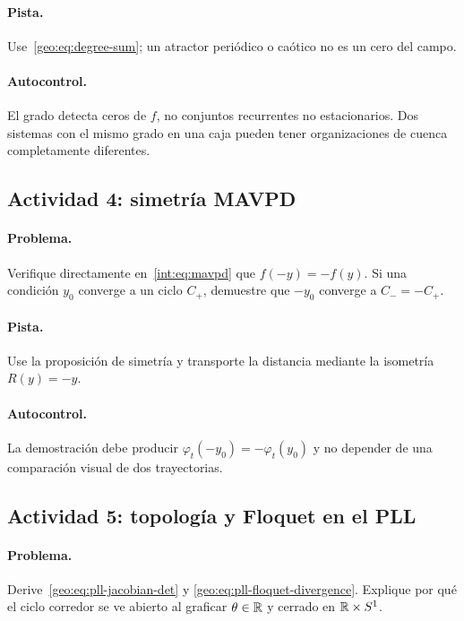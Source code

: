 \paragraph{Pista.}
Use~\eqref{geo:eq:degree-sum}; un atractor periódico o caótico no es un cero
del campo.

\paragraph{Autocontrol.}
El grado detecta ceros de \(f\), no conjuntos recurrentes no estacionarios.
Dos sistemas con el mismo grado en una caja pueden tener organizaciones de
cuenca completamente diferentes.

\subsection{Actividad 4: simetría MAVPD}

\paragraph{Problema.}
Verifique directamente en~\eqref{int:eq:mavpd} que \(f(-y)=-f(y)\). Si una
condición \(y_0\) converge a un ciclo \(C_+\), demuestre que \(-y_0\) converge
a \(C_-=-C_+\).

\paragraph{Pista.}
Use la proposición de simetría y transporte la distancia mediante la isometría
\(R(y)=-y\).

\paragraph{Autocontrol.}
La demostración debe producir
\(\varphi_t(-y_0)=-\varphi_t(y_0)\) y no depender de una comparación visual de
dos trayectorias.

\subsection{Actividad 5: topología y Floquet en el PLL}

\paragraph{Problema.}
Derive~\eqref{geo:eq:pll-jacobian-det} y
\eqref{geo:eq:pll-floquet-divergence}. Explique por qué el ciclo corredor se
ve abierto al graficar \(\theta\in\mathbb{R}\) y cerrado en \(\mathbb{R}\times S^1\).

